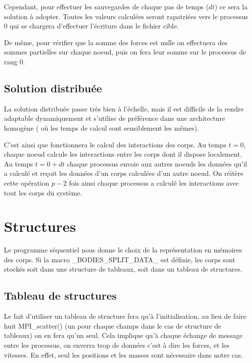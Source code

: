 \par Cependant, pour effectuer les sauvegardes de chaque pas de temps ($dt$) ce sera la solution à adopter. 
Toutes les valeurs calculées seront rapatriées vers le processus 0 qui se chargera d'effectuer 
l'écriture dans le fichier cible.\\

\par De même, pour vérifier que la somme des forces est nulle on effectuera des sommes partielles
sur chaque noeud, puis on fera leur somme sur le processus de rang 0.\\

\subsection{Solution distribuée}
\par La solution distribuée passe très bien à l'échelle, mais il est difficile de
la rendre adaptable dynamiquement et s'utilise de préférence dans une architecture homogène
( où les temps de calcul sont sensiblement les mêmes).\\

\par C'est ainsi que fonctionnera le calcul des interactions des corps. Au temps $t=0$, chaque noeud 
calcule les interactions entre les corps dont il dispose localement. Au temps $t=0+dt$ chaque
processus envoie aux autres noeuds les données qu'il a calculé et reçoit les données d'un corps
calculées d'un autre noeud. On réitère cette opération $p-2$ fois ainsi chaque processus a
calculé les interactions avec tout les corps du système.\\

\section{Structures}

\par Le programme séquentiel nous donne le choix de la représentation en mémoires des 
corps. Si la macro \_BODIES\_SPLIT\_DATA\_ est définie, les corps sont stockés soit
dans une structure de tableaux, soit dans un tableau de structures.\\


\subsection{Tableau de structures}

\par Le fait d'utiliser un tableau de structure fera qu'à l'initialisation, au lieu de faire huit 
MPI\_scatter() (un pour chaque champs dans le cas de structure de tableaux) on en fera qu'un seul.
Cela implique qu'à chaque échange de message entre les processus, on enverra trop de 
données c'est à dire les forces, et les vitesses.
En effet, seul les positions et les masses sont nécessaire dans notre cas.\\


